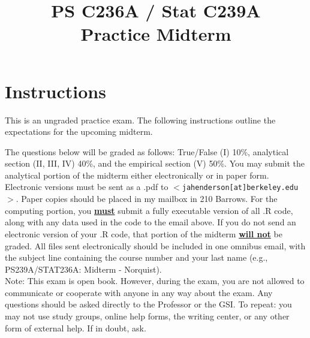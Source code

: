 \documentclass{article}
\title{PS C236A / Stat C239A \\  Practice Midterm \\ }%
\date{}
\begin{document}
\maketitle
\vspace{-4em}
\section*{Instructions}




This is an ungraded practice exam.  The following instructions outline
the expectations for the upcoming midterm. \vspace{1em}

\noindent The questions below will be graded as follows: True/False (I) 10\%,
analytical section (II, III, IV) 40\%, and the empirical section (V)
50\%.  You may submit the analytical portion of the midterm either
electronically or in paper form.  Electronic versions must be sent as
a .pdf to $<$\texttt{jahenderson[at]berkeley.edu}$>$. Paper copies
should be placed in my mailbox in 210 Barrows.  For the computing
portion, you \underline{\bf must}  submit a fully executable version of all
.R code, along with any data used in the code 
to the email above.  If you do not send an electronic version of your
.R code, that portion of the midterm \underline{\bf will not} be graded.  All files
sent electronically should be included
in one omnibus email, with the subject line containing the course number and your last name (e.g., PS239A/STAT236A: Midterm - Norquist).\\


\noindent Note: This exam is open book.  However, during the exam,
you are not allowed to communicate or cooperate with anyone in
any way about the exam. Any questions should be asked directly to the
Professor or the GSI. To repeat: you may not use study groups, online
help forms, the writing center, or any other form of external help.
If in doubt, ask.
\end{document}
